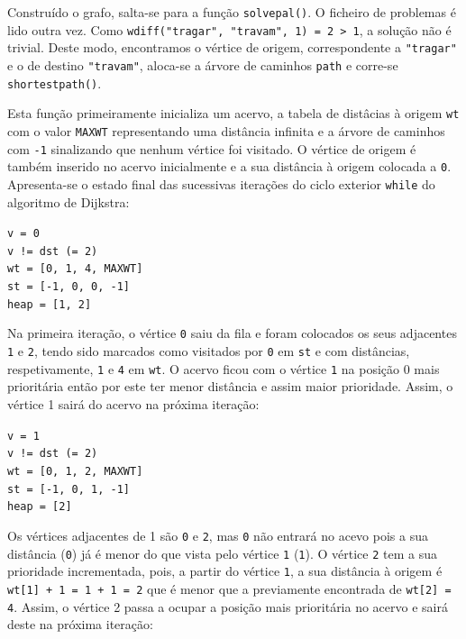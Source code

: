 \documentclass[a4paper, 18pt]{article}
\begin{document}
	\par
	Construído o grafo, salta-se para a função \texttt{solve\textunderscore pal()}. O ficheiro de problemas é lido outra vez. Como \texttt{w\textunderscore diff("tragar", "travam", 1) = 2 > 1}, a solução não é trivial. Deste modo, encontramos o vértice de origem, correspondente a \texttt{"tragar"} e o de destino \texttt{"travam"}, aloca-se a árvore de caminhos \texttt{path} e corre-se \texttt{shortest\textunderscore path()}.
	\par
	Esta função primeiramente inicializa um acervo, a tabela de distâcias à origem \texttt{wt} com o valor \texttt{MAX\textunderscore WT} representando uma distância infinita e a árvore de caminhos com \texttt{-1} sinalizando que nenhum vértice foi visitado. O vértice de origem é também inserido no acervo inicialmente e a sua distância à origem colocada a \texttt{0}. Apresenta-se o estado final das sucessivas iterações do ciclo exterior \texttt{while} do algoritmo de Dijkstra:
	\begin{center}
		\texttt{v = 0\\
		v != dst (= 2) \\
		wt = [0, 1, 4, MAX\textunderscore WT] \\
		st = [-1, 0, 0, -1] \\
		heap = [1, 2] \\}
	\end{center}
	\par
	Na primeira iteração, o vértice \texttt{0} saiu da fila e foram colocados os seus adjacentes \texttt{1} e \texttt{2}, tendo sido marcados como visitados por \texttt{0} em \texttt{st} e com distâncias, respetivamente, \texttt{1} e \texttt{4} em \texttt{wt}. O acervo ficou com o vértice \texttt{1} na posição 0 mais prioritária então por este ter menor distância e assim maior prioridade. Assim, o vértice 1 sairá do acervo na próxima iteração:
	\begin{center}
		\texttt{v = 1\\
		v != dst (= 2) \\
		wt = [0, 1, 2, MAX\textunderscore WT] \\
		st = [-1, 0, 1, -1] \\
		heap = [2] \\}
	\end{center}
	\par
	Os vértices adjacentes de 1 são \texttt{0} e \texttt{2}, mas \texttt{0} não entrará no acevo pois a sua distância (\texttt{0}) já é menor do que vista pelo vértice \texttt{1} (\texttt{1}). O vértice \texttt{2} tem a sua prioridade incrementada, pois, a partir do vértice \texttt{1}, a sua distância à origem é \texttt{wt[1] + 1 = 1 + 1 = 2} que é menor que a previamente encontrada de \texttt{wt[2] = 4}. Assim, o vértice 2 passa a ocupar a posição mais prioritária no acervo e sairá deste na próxima iteração:
\end{document}
